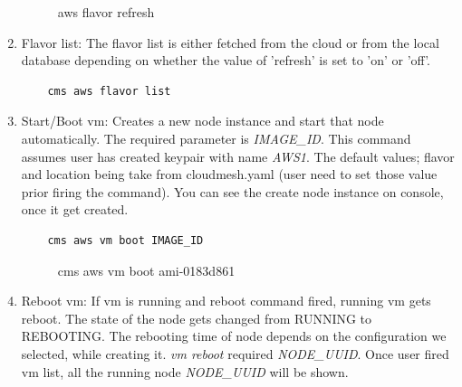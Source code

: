 \documentclass[9pt,twocolumn,twoside]{../../styles/osajnl}
\begin{document}
\begin{enumerate}
	\begin{figure}[h!]
		\centering
		\caption{aws flavor refresh }
		\label{fig:flavorlist}
	\end{figure}
	
	\item Flavor list: The flavor list is either fetched from the cloud or from the local database depending on whether the value of 'refresh' is set to 'on' or 'off'.
	
	\begin{verbatim}
    cms aws flavor list
	\end{verbatim}
	
    \item Start/Boot vm: Creates a new node instance and start that node automatically. The required parameter is \textit{IMAGE\_ID}. This command assumes user has created keypair with name \textit{AWS1}. The default values; flavor and location being take from cloudmesh.yaml (user need to set those value prior firing the command). You can see the create node instance on console, once it get created.
    
    \begin{verbatim}
    cms aws vm boot IMAGE_ID
    \end{verbatim}
    
   	\begin{figure}[h!]
	   	\centering
	   	\caption{cms aws vm boot ami-0183d861 }
	   	\label{fig:vmboot}
    \end{figure}

    \item Reboot vm: If vm is running and reboot command fired, running vm gets reboot. The state of the node gets changed from RUNNING to 	REBOOTING. The rebooting time of node depends on the configuration we selected, while creating it. \textit{vm reboot} required \textit{NODE\_UUID}. Once user fired vm list, all the running node \textit{NODE\_UUID} will be shown.
    

\end{enumerate}
\end{document}
